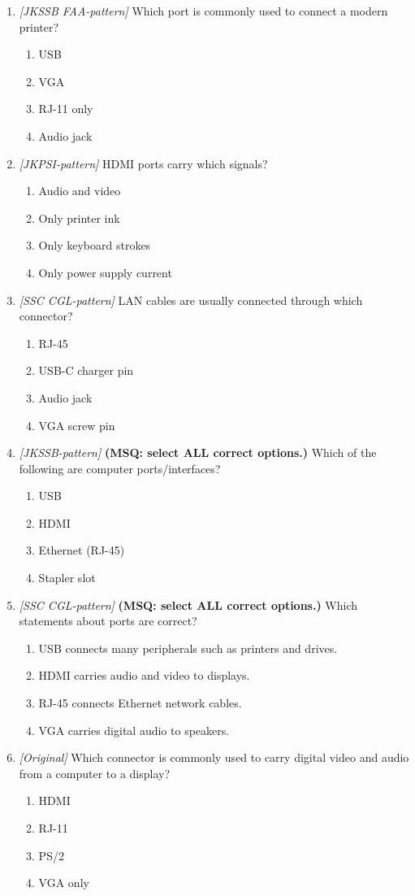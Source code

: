 \begin{enumerate}[label=\textbf{Q\arabic*.}, leftmargin=*]
\item \textit{[JKSSB FAA-pattern]} Which port is commonly used to connect a modern printer?
  \begin{enumerate}[label=\Alph*.]
    \item USB
    \item VGA
    \item RJ-11 only
    \item Audio jack
  \end{enumerate}
\item \textit{[JKPSI-pattern]} HDMI ports carry which signals?
  \begin{enumerate}[label=\Alph*.]
    \item Audio and video
    \item Only printer ink
    \item Only keyboard strokes
    \item Only power supply current
  \end{enumerate}
\item \textit{[SSC CGL-pattern]} LAN cables are usually connected through which connector?
  \begin{enumerate}[label=\Alph*.]
    \item RJ-45
    \item USB-C charger pin
    \item Audio jack
    \item VGA screw pin
  \end{enumerate}
\item \textit{[JKSSB-pattern]} \textbf{(MSQ: select ALL correct options.)} Which of the following are computer ports/interfaces?
  \begin{enumerate}[label=\Alph*.]
    \item USB
    \item HDMI
    \item Ethernet (RJ-45)
    \item Stapler slot
  \end{enumerate}
\item \textit{[SSC CGL-pattern]} \textbf{(MSQ: select ALL correct options.)} Which statements about ports are correct?
  \begin{enumerate}[label=\Alph*.]
    \item USB connects many peripherals such as printers and drives.
    \item HDMI carries audio and video to displays.
    \item RJ-45 connects Ethernet network cables.
    \item VGA carries digital audio to speakers.
  \end{enumerate}
\item \textit{[Original]} Which connector is commonly used to carry digital video and audio from a computer to a display?
  \begin{enumerate}[label=\Alph*.]
\item HDMI
   \item RJ-11
   \item PS/2
   \item VGA only
  \end{enumerate}


\end{enumerate}
